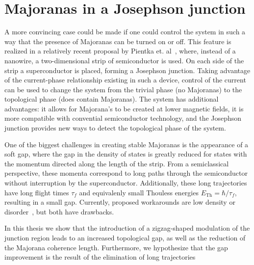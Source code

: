 \section{Majoranas in a Josephson junction}
	A more convincing case could be made if one could control the system in such a way that the presence of Majoranas can be turned on or off.
	This feature is realized in a relatively recent proposal by Pientka et. al~\cite{pientka_topological_2017}, where, instead of a nanowire, a two-dimensional strip of semiconductor is used.
	On each side of the strip a superconductor is placed, forming a Josephson junction.
	Taking advantage of the current-phase relationship existing in such a device, control of the current can be used to change the system from the trivial phase (no Majoranas) to the topological phase (does contain Majoranas).
	The system has additional advantages: it allows for Majorana's to be created at lower magnetic fields, it is more compatible with convential semiconductor technology, and the Josephson junction provides new ways to detect the topological phase of the system.

	One of the biggest challenges in creating stable Majoranas is the appearance of a soft gap, where the gap in the density of states is greatly reduced for states with the momentum directed along the length of the strip.
	From a semiclassical perspective, these momenta correspond to long paths through the semiconductor without interruption by the superconductor.
	Additionally, these long trajectories have long flight times $\tau_f$ and equivalenly small Thouless energies $E_{\textrm{Th}}=\hbar / \tau_f$, resulting in a small gap. 
	Currently, proposed workarounds are low density or disorder~\cite{haim_double-edge_2018}, but both have drawbacks.

	In this thesis we show that the introduction of a zigzag-shaped modulation of the junction region leads to an increased topological gap, as well as the reduction of the Majorana coherence length.
	Furthermore, we hypothesize that the gap improvement is the result of the elimination of long trajectories